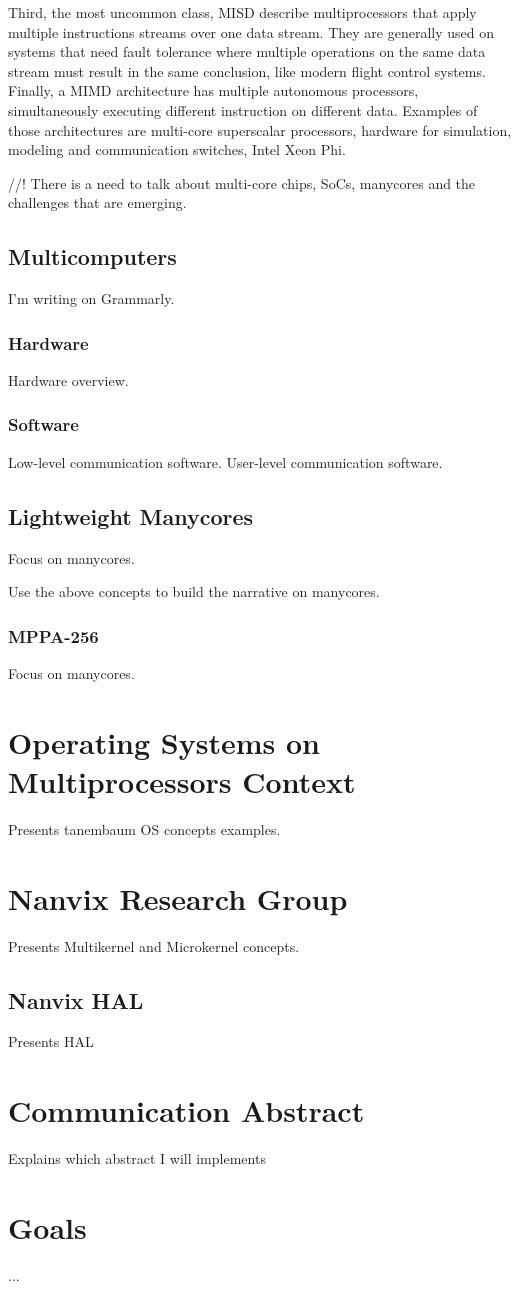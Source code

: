 		Third, the most uncommon class, MISD describe multiprocessors that apply multiple
		instructions streams over one data stream.
		They are generally used on systems that need fault tolerance where multiple operations
		on the same data stream must result in the same conclusion, like modern flight control systems.
		Finally, a MIMD architecture has multiple autonomous processors, simultaneously
		executing different instruction on different data.
		Examples of those architectures are multi-core superscalar processors, hardware
		for simulation, modeling and communication switches, Intel Xeon Phi.

		//! There is a need to talk about multi-core chips, SoCs, manycores and the challenges that are emerging.

	\subsection{Multicomputers}

		I'm writing on Grammarly.

		\subsubsection{Hardware}
			Hardware overview.

		\subsubsection{Software}
			Low-level communication software.
			User-level communication software.
	
	\subsection{Lightweight Manycores}
		Focus on manycores.

		Use the above concepts to build the narrative on manycores.
		
		\subsubsection{MPPA-256}
			Focus on manycores.
	
\section{Operating Systems on Multiprocessors Context}
	Presents tanembaum OS concepts examples.

\section{Nanvix Research Group}
	Presents Multikernel and Microkernel concepts.

	\subsection{Nanvix HAL}
		Presents HAL

\section{Communication Abstract}
	Explains which abstract I will implements

\section{Goals}
	...